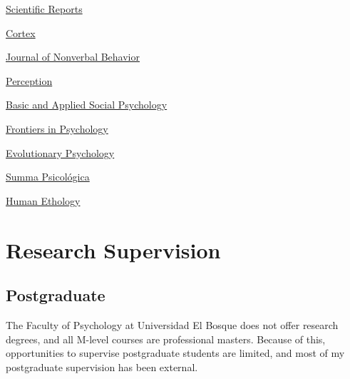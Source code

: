\documentclass[11pt,a4paper,]{awesome-cv}
\begin{document}
\begin{cventries}
{\begin{cvitems}
\item \href{https://www.nature.com/srep/}{Scientific Reports}
\item \href{https://www.sciencedirect.com/journal/cortex}{Cortex}
\item \href{https://www.springer.com/journal/10919/}{Journal of Nonverbal Behavior}
\item \href{https://journals.sagepub.com/home/pec}{Perception}
\item \href{https://www.tandfonline.com/journals/hbas20}{Basic and Applied Social Psychology}
\item \href{https://www.frontiersin.org/journals/psychology}{Frontiers in Psychology}
\item \href{https://journals.sagepub.com/home/evp}{Evolutionary Psychology}
\item \href{http://sumapsicologica.konradlorenz.edu.co/}{Summa Psicológica}
\item \href{https://ishe.org/human-ethology/}{Human Ethology}
\end{cvitems}}
\end{cventries}

\hypertarget{research-supervision}{%
\section{Research Supervision}\label{research-supervision}}

\hypertarget{section-3}{%
\subsection{\texorpdfstring{\textbf{Postgraduate}}{}}\label{section-3}}

The Faculty of Psychology at Universidad El Bosque does not offer
research degrees, and all M-level courses are professional masters.
Because of this, opportunities to supervise postgraduate students are
limited, and most of my postgraduate supervision has been external.
\end{document}
